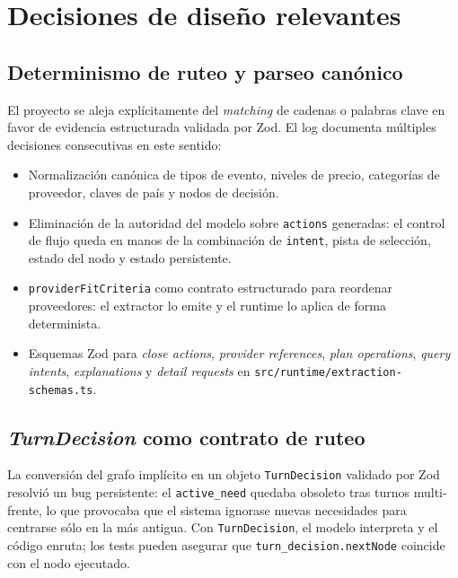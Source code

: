 \documentclass[11pt,a4paper]{article}
\begin{document}
\section{Decisiones de diseño relevantes}

\subsection{Determinismo de ruteo y parseo canónico}

El proyecto se aleja explícitamente del \emph{matching} de cadenas o
palabras clave en favor de evidencia estructurada validada por Zod. El
log documenta múltiples decisiones consecutivas en este sentido:

\begin{itemize}[leftmargin=*,itemsep=1pt]
  \item Normalización canónica de tipos de evento, niveles de precio,
        categorías de proveedor, claves de país y nodos de decisión.
  \item Eliminación de la autoridad del modelo sobre
        \texttt{actions} generadas: el control de flujo queda en
        manos de la combinación de \texttt{intent}, pista de selección,
        estado del nodo y estado persistente.
  \item \texttt{providerFitCriteria} como contrato estructurado para
        reordenar proveedores: el extractor lo emite y el runtime lo
        aplica de forma determinista.
  \item Esquemas Zod para \emph{close actions}, \emph{provider
        references}, \emph{plan operations}, \emph{query intents},
        \emph{explanations} y \emph{detail requests} en
        \texttt{src/runtime/extraction-schemas.ts}.
\end{itemize}

\subsection{\emph{TurnDecision} como contrato de ruteo}

La conversión del grafo implícito en un objeto
\texttt{TurnDecision} validado por Zod resolvió un bug persistente: el
\texttt{active\_need} quedaba obsoleto tras turnos multi-frente, lo que
provocaba que el sistema ignorase nuevas necesidades para centrarse
sólo en la más antigua. Con \texttt{TurnDecision}, el modelo interpreta
y el código enruta; los tests pueden asegurar que
\texttt{turn\_decision.nextNode} coincide con el nodo ejecutado.
\end{document}
